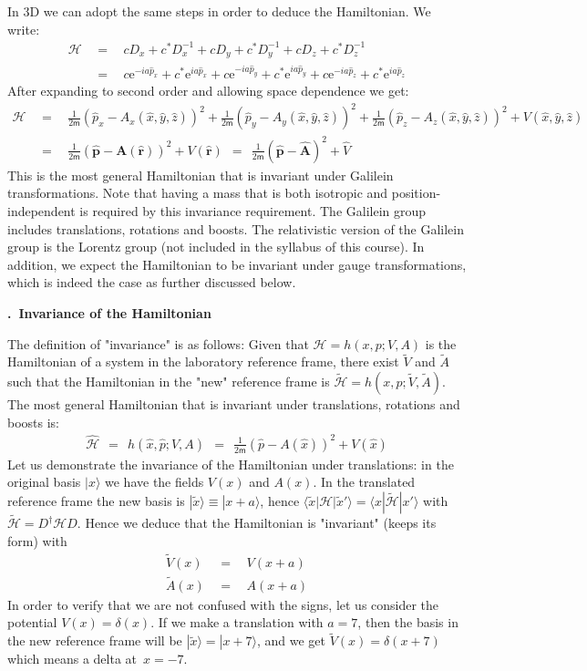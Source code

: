 \documentclass[onecolumn,fleqn, 11pt]{revtex4}
\newcommand{\eexp}{\mathrm{e}^}
\newcommand{\mass}{\mathsf{m}}
\newcommand{\beq}{\begin{eqnarray}}
\newcommand{\eeq}{\end{eqnarray}}
\renewcommand{\thesubsection}{\arabic{subsection}}
\renewcommand{\thesubsubsection}{\arabic{subsubsection}}
\newcommand{\sheadC}[1]
{
\addtocounter{subsubsection}{1}
\vspace{5mm}
{\bf \thesubsection.\thesubsubsection \ #1}  
\nopagebreak
\phantomsection
}
\begin{document}
In 3D we can adopt the same steps in order to deduce 
the Hamiltonian. We write:
\beq
\mathcal{H} & \ \ = \ \ & cD_x + c^*D_x^{-1} + cD_y + c^* D_y^{-1}+ cD_z+c^*D_z^{-1} 
\\ \nonumber
& \ \ = \ \ & c \eexp{-ia\hat{p}_x}
+ c^* \eexp{ia\hat{p}_x}
+ c \eexp{-ia\hat{p}_y}
+ c^* \eexp{ia\hat{p}_y}
+ c \eexp{-ia\hat{p}_z}
+ c^* \eexp{ia\hat{p}_z} 
\eeq
After expanding to second order and allowing space dependence we get:
\beq \nonumber
\mathcal{H} 
& \ \ = \ \ & 
\frac{1}{2\mass}( \hat{p}_x-A_x(\hat{x}, \hat{y}, \hat{z}))^2 
+ \frac{1}{2\mass}( \hat{p}_y-A_y(\hat{x}, \hat{y}, \hat{z}))^2 
+ \frac{1}{2\mass}( \hat{p}_z-A_z(\hat{x}, \hat{y}, \hat{z}))^2 
+ V(\hat{x},\hat{y},\hat{z})
\\
& \ \ = \ \ &
\frac{1}{2\mass}( \hat{\mathbf{p}}-\mathbf{A}( \hat{\mathbf{r}}))^2+ V (\hat{\mathbf{r}}) 
\ \ = \ \
\frac{1}{2\mass}( \hat{\mathbf{p}}-\hat{\mathbf{A}} )^2+ \hat{V} 
\eeq
This is the most general Hamiltonian that is invariant 
under Galilein transformations. Note that having a mass
that is both isotropic and position-independent is 
required by this invariance requirement.  
The Galilein group includes translations, rotations and boosts. 
The relativistic version of the Galilein group is the Lorentz group 
(not included in the syllabus of this course). 
In addition, we expect the Hamiltonian to be invariant under 
gauge transformations, which is indeed the case as further 
discussed below.

 
\sheadC{Invariance of the Hamiltonian} 

The definition of "invariance" is as follows:  
Given that ${ \mathcal{H} = h(x,p; V, A) }$ 
is the Hamiltonian of a system in the laboratory reference frame, 
there exist $\tilde{V}$ and $\tilde{A}$ such that the Hamiltonian 
in the "new" reference frame is ${\tilde{\mathcal{H}}=h(x,p; \tilde{V}, \tilde{A}) }$.
The most general Hamiltonian that is invariant 
under translations, rotations and boosts is:
\beq
\hat{\mathcal{H}} \ \ = \ \ h(\hat{x},\hat{p}; V, A) 
\ \ = \ \ \frac{1}{2\mass} ( \hat{p} - A(\hat{x}) )^2 + V(\hat{x}) 
\eeq
Let us demonstrate the invariance of the Hamiltonian under translations: 
in the original basis ${|x\rangle}$ we have the fields $V(x)$ and $A(x)$. 
In the translated reference frame the new basis is ${|\tilde{x}\rangle \equiv |x+a\rangle}$, 
hence ${\langle \tilde{x} |\mathcal{H} | \tilde{x}' \rangle = \langle x |\tilde{\mathcal{H}} | x' \rangle}$ 
with ${\tilde{\mathcal{H}}=D^{\dag}\mathcal{H}D}$. Hence we deduce that 
the Hamiltonian is "invariant" (keeps its form) with   
\beq
\tilde{V}(x) \ \ &=& \ \ V(x+a) \\
\tilde{A}(x) \ \ &=& \ \ A(x+a)
\eeq
In order to verify that we are not confused with the signs, 
let us consider the potential ${V(x)=\delta (x)}$. 
If we make a translation with ${a=7}$, 
then the basis in the new reference frame will 
be ${|\tilde{x} \rangle = |x+7 \rangle }$, 
and we get ${\tilde{V}(x)=\delta {(x+7)}}$ 
which means a delta at~${x=-7}$.
\end{document}
